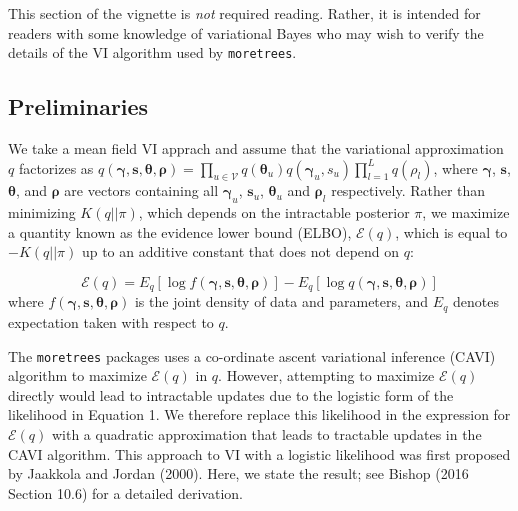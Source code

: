 \documentclass[]{article}
\begin{document}
This section of the vignette is \emph{not} required reading. Rather, it
is intended for readers with some knowledge of variational Bayes who may
wish to verify the details of the VI algorithm used by
\texttt{moretrees}.

\hypertarget{preliminaries}{%
\subsection{Preliminaries}\label{preliminaries}}

We take a mean field VI apprach and assume that the variational
approximation \(q\) factorizes as
\(q\left(\boldsymbol{\gamma},\mathbf{s}, \boldsymbol{\theta}, \boldsymbol{\rho} \right) = \prod_{u \in \mathcal{V}} q \left( \boldsymbol{\theta}_u \right) q\left(\boldsymbol{\gamma}_u, s_u \right) \prod_{l=1}^L q(\rho_l)\),
where \(\boldsymbol{\gamma}\), \(\mathbf{s}\), \(\boldsymbol{\theta}\),
and \(\boldsymbol{\rho}\) are vectors containing all
\(\boldsymbol{\gamma}_u\), \(\mathbf{s}_u\), \(\boldsymbol{\theta}_u\)
and \(\boldsymbol{\rho}_l\) respectively. Rather than minimizing
\(K(q || \pi)\), which depends on the intractable posterior \(\pi\), we
maximize a quantity known as the evidence lower bound (ELBO),
\(\mathcal{E}(q)\), which is equal to \(- K(q || \pi)\) up to an
additive constant that does not depend on \(q\):

\begin{equation}
\tag{2}
\mathcal{E}(q) = E_{q} \left[\log f \left(\boldsymbol{\gamma}, \mathbf{s}, \boldsymbol{\theta}, \boldsymbol{\rho} \right) \right] - E_{q} \left[\log q \left(\boldsymbol{\gamma}, \mathbf{s}, \boldsymbol{\theta}, \boldsymbol{\rho} \right) \right] 
\end{equation} where
\(f \left(\boldsymbol{\gamma}, \mathbf{s}, \boldsymbol{\theta}, \boldsymbol{\rho} \right)\)
is the joint density of data and parameters, and \(E_q\) denotes
expectation taken with respect to \(q\).

The \texttt{moretrees} packages uses a co-ordinate ascent variational
inference (CAVI) algorithm to maximize \(\mathcal{E}(q)\) in \(q\).
However, attempting to maximize \(\mathcal{E}(q)\) directly would lead
to intractable updates due to the logistic form of the likelihood in
Equation 1. We therefore replace this likelihood in the expression for
\(\mathcal{E}(q)\) with a quadratic approximation that leads to
tractable updates in the CAVI algorithm. This approach to VI with a
logistic likelihood was first proposed by Jaakkola and Jordan (2000).
Here, we state the result; see Bishop (2016 Section 10.6) for a detailed
derivation.
\end{document}
